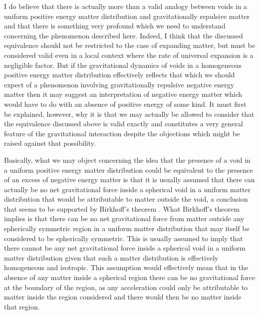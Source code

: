 \documentclass[notitlepage,12pt]{report}
\begin{document}
I do believe that there is actually more than a valid analogy between voids in a uniform positive energy matter distribution and gravitationally repulsive matter and that there is something very profound which we need to understand concerning the phenomenon described here. Indeed, I think that the discussed equivalence should not be restricted to the case of expanding matter, but must be considered valid even in a local context where the rate of universal expansion is a negligible factor. But if the gravitational dynamics of voids in a homogeneous positive energy matter distribution effectively reflects that which we should expect of a phenomenon involving gravitationally repulsive negative energy matter then it may suggest an interpretation of negative energy matter which would have to do with an absence of positive energy of some kind. It must first be explained, however, why it is that we may actually be allowed to consider that the equivalence discussed above is valid exactly and constitutes a very general feature of the gravitational interaction despite the objections which might be raised against that possibility.

Basically, what we may object concerning the idea that the presence of a void in a uniform positive energy matter distribution could be equivalent to the presence of an excess of negative energy matter is that it is usually assumed that there can actually be no net gravitational force inside a spherical void in a uniform matter distribution that would be attributable to matter outside the void, a conclusion that seems to be supported by Birkhoff's theorem \cite{Birkhoff-1}. What Birkhoff's theorem implies is that there can be no net gravitational force from matter outside any spherically symmetric region in a uniform matter distribution that may itself be considered to be spherically symmetric. This is usually assumed to imply that there cannot be any net gravitational force inside a spherical void in a uniform matter distribution given that such a matter distribution is effectively homogeneous and isotropic. This assumption would effectively mean that in the absence of any matter inside a spherical region there can be no gravitational force at the boundary of the region, as any acceleration could only be attributable to matter inside the region considered and there would then be no matter inside that region.
\end{document}
